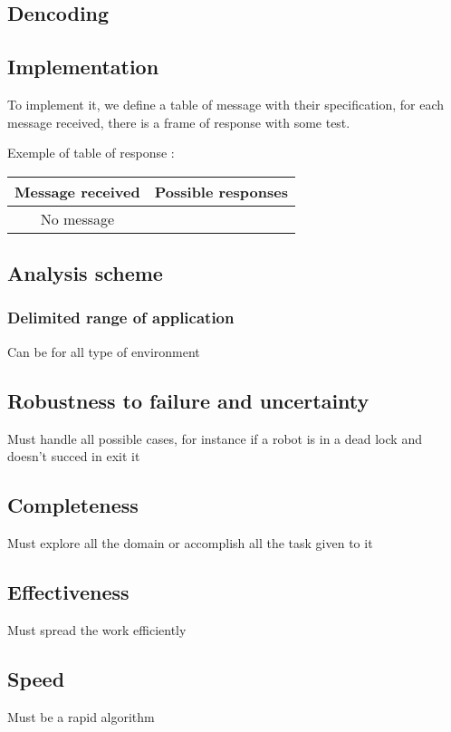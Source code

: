 \documentclass[main.tex]{subfiles}
\begin{document}
\subsection{Dencoding}


\subsection{Implementation}

To implement it, we define a table of message with their specification, for each message received, there is a frame of response with some test.

Exemple of table of response :

\begin{table}[H]
	\centering
	\begin{tabular}{|c|c|}
		\textbf{Message received} & \textbf{Possible responses}\\
		\hline
		No message
		
	\end{tabular}
\end{table}



\subsection{Analysis scheme}

\subsubsection{Delimited range of application}
Can be for all type of environment

\subsection{Robustness to failure and uncertainty}
Must handle all possible cases, for instance if a robot is in a dead lock and doesn't succed in exit it

\subsection{Completeness}
Must explore all the domain or accomplish all the task given to it

\subsection{Effectiveness}
Must spread the work efficiently

\subsection{Speed}
Must be a rapid algorithm
\end{document}
